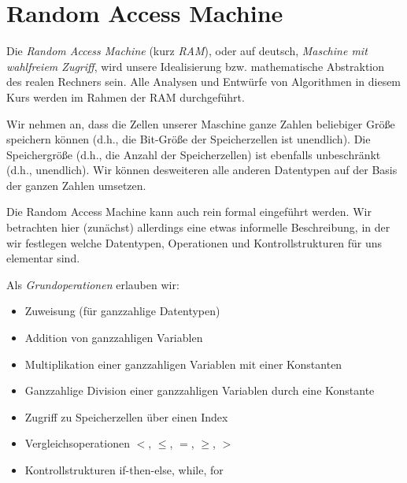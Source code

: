 \section{Random Access Machine}
\label{sect:RAM}

\begin{bem} 
Die \emph{Random Access Machine} (kurz \emph{RAM}), oder auf deutsch, \emph{Maschine mit wahlfreiem Zugriff}, wird unsere Idealisierung bzw. mathematische Abstraktion des realen Rechners sein. Alle Analysen und Entwürfe von Algorithmen in diesem Kurs werden im Rahmen der RAM durchgeführt. 

Wir nehmen an, dass die Zellen unserer Maschine ganze Zahlen beliebiger Größe speichern können (d.h., die Bit-Größe der Speicherzellen ist unendlich). Die Speichergröße (d.h., die Anzahl der Speicherzellen) ist ebenfalls unbeschränkt (d.h., unendlich). Wir können desweiteren alle anderen Datentypen auf der Basis der ganzen Zahlen umsetzen. 

Die Random Access Machine kann auch rein formal eingeführt werden. Wir betrachten hier (zunächst) allerdings eine etwas informelle Beschreibung, in der wir festlegen welche Datentypen, Operationen und Kontrollstrukturen für uns elementar sind. 

Als \emph{Grundoperationen} erlauben wir:
%
\begin{itemize}
	\item Zuweisung (für ganzzahlige Datentypen)
	\item Addition von ganzzahligen Variablen
	\item Multiplikation einer ganzzahligen Variablen mit einer Konstanten
	\item Ganzzahlige Division einer ganzzahligen Variablen durch eine Konstante
	\item Zugriff zu Speicherzellen über einen Index
	\item Vergleichsoperationen $<$, $\le$, $=$, $\ge$, $>$ 
	\item Kontrollstrukturen if-then-else, while, for 
\end{itemize}
\end{bem} 


